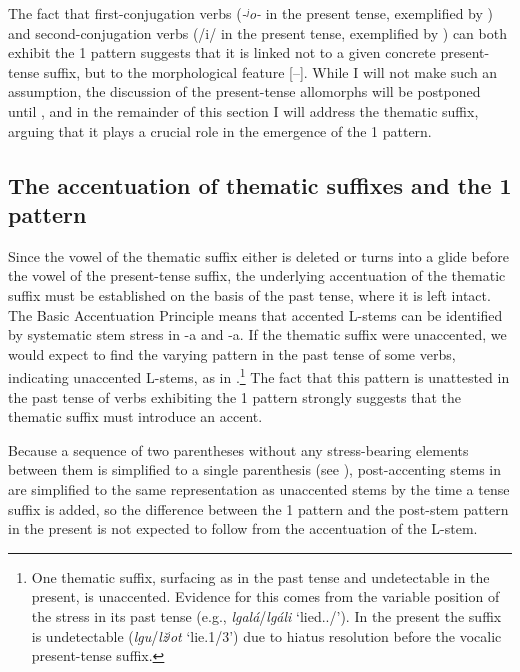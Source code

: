 \documentclass[output=paper,colorlinks,citecolor=black,koreanfont]{langscibook}
\begin{document}
\newpage
The fact that first-conjugation verbs (\textit{-ʲo-} in the present tense, exemplified by ) and second-conjugation verbs (/i/ in the present tense, exemplified by ) can both exhibit the {1\SG} pattern suggests that it is linked not to a given concrete present-tense suffix, but to the morphological feature [{$–$\PST}]. While I will not make such an assumption, the discussion of the present-tense allomorphs will be postponed until , and in the remainder of this section I will address the thematic suffix, arguing that it plays a crucial role in the emergence of the {1\SG} pattern.

\subsection{The accentuation of thematic suffixes and the {1\SG} pattern}\label{mat:subsec:ThematicAnd1SG}

Since the vowel of the thematic suffix either is deleted or turns into a glide before the vowel of the present-tense suffix, the underlying accentuation of the thematic suffix must be established on the basis of the past tense, where it is left intact. The Basic Accentuation Principle  means that accented L-stems can be identified by systematic stem stress in -a and -a. If the thematic suffix were unaccented, we would expect to find the varying pattern in the past tense of some verbs, indicating unaccented L-stems, as in .\footnote{\label{mat:fn:UnnaccentedA}One thematic suffix, surfacing as  in the past tense and undetectable in the present, is unaccented. Evidence for this comes from the variable position of the stress in its past tense (e.g., \textit{lgalá}/\textit{lgáli} ‘lied.{\FEM.\SG}/{\PL}’). In the present the suffix is undetectable (\textit{lgu}/\textit{lžʲot} ‘lie.{1\SG}/{3\SG}’) due to hiatus resolution before the vocalic present-tense suffix.} The fact that this pattern is unattested in the past tense of verbs exhibiting the {1\SG} pattern strongly suggests that the thematic suffix must 
introduce an accent.

Because a sequence of two parentheses without any stress-bearing elements between them is simplified to a single parenthesis (see ), post-accenting stems in  are simplified to the same representation as unaccented stems  by the time a tense suffix is added, so the difference between the {1\SG} pattern and the post-stem pattern in the present is not expected to follow from the accentuation of the L-stem.
\end{document}
